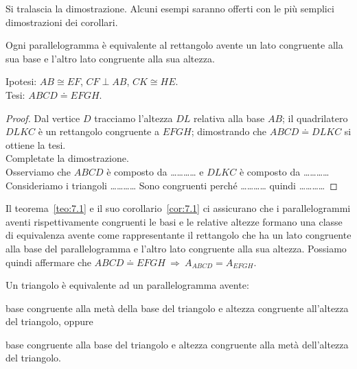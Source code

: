 Si tralascia la dimostrazione. Alcuni esempi saranno offerti con le più 
semplici dimostrazioni dei corollari.
 
\begin{corollario}\label{cor:7.1}
Ogni parallelogramma è equivalente al rettangolo avente un lato 
congruente alla sua base e l'altro lato congruente alla sua altezza.
\end{corollario}

\noindent Ipotesi: \(AB\cong EF\), \(CF\perp AB\), \(CK\cong HE\).\\
Tesi: \(ABCD\doteq EFGH\).

\begin{figure*}[!htb]
  \centering
\end{figure*}

\noindent\begin{minipage}{0.65\textwidth}\parindent15pt
\begin{proof}
Dal vertice \(D\) tracciamo l'altezza \(DL\) relativa alla base \(AB\); il 
quadrilatero \(DLKC\) è un rettangolo congruente a \(EFGH\); dimostrando 
che \(ABCD\doteq DLKC\) si ottiene la tesi.\\
Completate la dimostrazione.\\
Osserviamo che \(ABCD\) è composto da \ldots\ldots\ldots\ldots{}
e \(DLKC\) è composto da \ldots\ldots\ldots\ldots{} 
Consideriamo i triangoli \ldots\ldots\ldots\ldots{}
Sono congruenti perché \ldots\ldots\ldots\ldots{}
quindi \ldots\ldots\ldots\ldots{}
\end{proof}
\end{minipage}\hfil
\begin{minipage}{0.35\textwidth}
  \centering
\end{minipage}\vspace{5pt}

Il teorema~\ref{teo:7.1} e il suo corollario~\ref{cor:7.1} ci 
assicurano che i parallelogrammi aventi rispettivamente congruenti le 
basi e le relative altezze formano una classe di equivalenza avente 
come rappresentante il rettangolo che ha un lato congruente alla base 
del parallelogramma e l'altro lato congruente alla sua altezza. 
Possiamo quindi affermare che \(ABCD\doteq EFGH \:\Rightarrow\: 
A_{ABCD} = A_{EFGH}\).

\begin{teorema}\label{teo:7.2}
Un triangolo è equivalente ad un parallelogramma avente:
\begin{enumeratea}
\item base congruente alla metà della base del triangolo e altezza 
congruente all'altezza del triangolo, oppure
\item base congruente alla base del triangolo e altezza congruente 
alla metà dell'altezza del triangolo.
\end{enumeratea}
\end{teorema}

